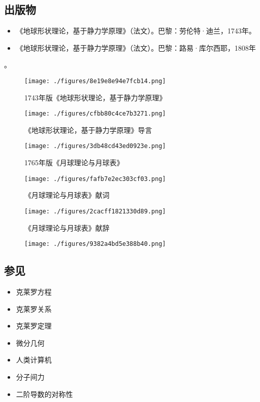 \subsection{出版物}  
\begin{itemize}
\item 《地球形状理论，基于静力学原理》（法文）。巴黎：劳伦特·迪兰，1743年。  
\item 《地球形状理论，基于静力学原理》（法文）。巴黎：路易·库尔西耶，1808年
\end{itemize}。
\begin{figure}[ht]
\centering
\texttt{[image: ./figures/8e19e8e94e7fcb14.png]}
\caption{1743年版《地球形状理论，基于静力学原理》} \label{fig_Alexis_4}
\end{figure}
\begin{figure}[ht]
\centering
\texttt{[image: ./figures/cfbb80c4ce7b3271.png]}
\caption{《地球形状理论，基于静力学原理》导言} \label{fig_Alexis_5}
\end{figure}
\begin{figure}[ht]
\centering
\texttt{[image: ./figures/3db48cd43ed0923e.png]}
\caption{1765年版《月球理论与月球表》} \label{fig_Alexis_6}
\end{figure}
\begin{figure}[ht]
\centering
\texttt{[image: ./figures/fafb7e2ec303cf03.png]}
\caption{《月球理论与月球表》献词} \label{fig_Alexis_7}
\end{figure}
\begin{figure}[ht]
\centering
\texttt{[image: ./figures/2cacff1821330d89.png]}
\caption{《月球理论与月球表》献辞} \label{fig_Alexis_8}
\end{figure}
\begin{figure}[ht]
\centering
\texttt{[image: ./figures/9382a4bd5e388b40.png]}
\caption{} \label{fig_Alexis_9}
\end{figure}
\subsection{参见}  
\begin{itemize}
\item 克莱罗方程  
\item 克莱罗关系  
\item 克莱罗定理  
\item 微分几何  
\item 人类计算机  
\item 分子间力  
\item 二阶导数的对称性
\end{itemize}
